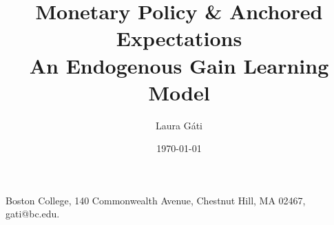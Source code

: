 \documentclass[AEJ]{AEA}
\begin{document}
\title{Monetary Policy \& Anchored Expectations \\ An Endogenous Gain Learning Model}
\shortTitle{}
\author{Laura G\'ati}%
\date{\today}
\JEL{}
\Keywords{}

\begin{abstract}
    
\end{abstract}

\maketitle

\centering
Boston College, 140 Commonwealth Avenue, Chestnut Hill, MA 02467, gati@bc.edu.
\end{document}
